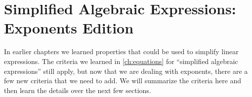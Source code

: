 %
%
%
%
%
%
%
%
%
%

\section{Simplified Algebraic Expressions: Exponents Edition}

In earlier chapters we learned properties that could be used to simplify linear expressions. The criteria we learned in \cref{ch:equations} for ``simplified algebraic expressions'' still apply, but now that we are dealing with exponents, there are a few new criteria that we need to add. We will summarize the criteria here and then learn the details over the next few sections.

